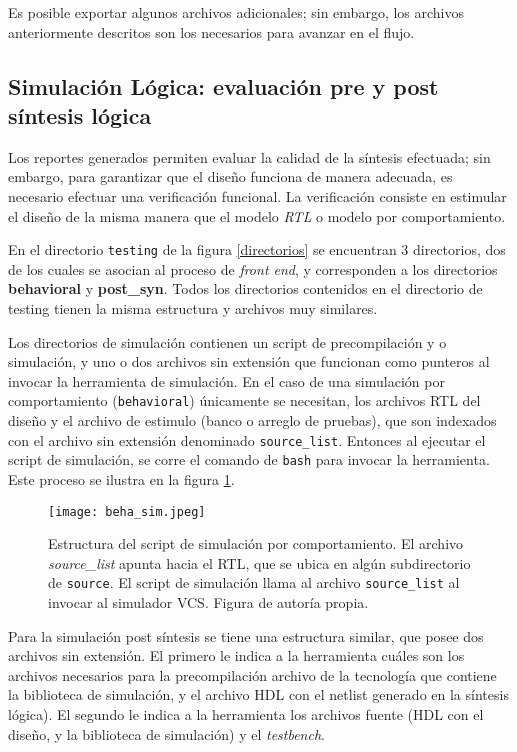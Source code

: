 Es posible exportar algunos archivos adicionales; sin embargo, los archivos anteriormente descritos son los necesarios para avanzar en el flujo.

\subsection{Simulación Lógica: evaluación pre y post síntesis lógica}
\label{sec:log_sim}
Los reportes generados permiten evaluar la calidad de la síntesis efectuada; sin embargo, para garantizar que el diseño funciona de manera adecuada, es necesario efectuar una verificación funcional. La verificación consiste en estimular el diseño de la misma manera que el modelo \textit{RTL} o modelo por comportamiento.

En el directorio \texttt{testing} de la figura \ref{directorios} se encuentran 3 directorios, dos de los cuales se asocian al proceso de \textit{front end}, y corresponden a los directorios \textbf{behavioral} y \textbf{post\_syn}. Todos los directorios contenidos en el directorio de testing tienen la misma estructura y archivos muy similares.

Los directorios de simulación contienen un script de precompilación y o simulación, y uno o dos archivos sin extensión que funcionan como punteros al invocar la herramienta de simulación. En el caso de una simulación por comportamiento (\texttt{behavioral}) únicamente se necesitan, los archivos RTL del diseño y el archivo de estimulo (banco o arreglo de pruebas), que son indexados con el archivo sin extensión denominado \texttt{source\_list}. Entonces al ejecutar el script de simulación, se corre el comando de \texttt{bash} para invocar la herramienta. Este proceso se ilustra en la figura \ref{beha_sim}.

\begin{figure}[h]
\texttt{[image: beha\_sim.jpeg]}
\centering
\caption{Estructura del script de simulación por comportamiento. El archivo \textit{source\_list} apunta hacia el RTL, que se ubica en algún subdirectorio de \texttt{source}. El script de simulación llama al archivo \texttt{source\_list} al invocar al simulador VCS. Figura de autoría propia.}
\label{beha_sim}
\end{figure}

Para la simulación post síntesis se tiene una estructura similar, que posee dos archivos sin extensión. El primero le indica a la herramienta cuáles son los archivos necesarios para la precompilación archivo de la tecnología que contiene la biblioteca de simulación, y el archivo HDL con el netlist generado en la síntesis lógica). El segundo le indica a la herramienta los archivos fuente (HDL con el diseño, y la biblioteca de simulación) y el \textit{testbench}.

